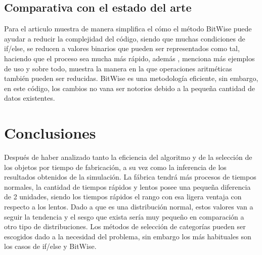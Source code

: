 \documentclass{article}
\begin{document}
\subsection{Comparativa con el estado del arte}
Para el articulo \citep{article}muestra de manera simplifica el cómo el método BitWise puede ayudar a reducir la complejidad del código, siendo que muchas condiciones de if/else, se reducen a valores binarios que pueden ser representados como tal, haciendo que el proceso sea mucha más rápido, además \citep{chandra2013application}, menciona más ejemplos de uso y sobre todo, muestra la manera en la que operaciones aritméticas también pueden ser reducidas.
BitWise es una metodología eficiente, sin embargo, en este código, los cambios no vana ser notorios debido a la pequeña cantidad de datos existentes.
\section{Conclusiones}
Después de haber analizado tanto la eficiencia del algoritmo y de la selección de los objetos por tiempo de fabricación, a su vez como la inferencia de los resultados obtenidos de la simulación. La fábrica tendrá más procesos de tiempos normales, la cantidad de tiempos rápidos y lentos posee una pequeña diferencia de 2 unidades, siendo los tiempos rápidos el rango con esa ligera ventaja con respecto a los lentos. Dado a que es una distribución normal, estos valores van a seguir la tendencia y el sesgo que exista sería muy pequeño en comparación a otro tipo de distribuciones. 
Los métodos de selección de categorías pueden ser escogidos dado a la necesidad del problema, sin embargo los más habituales son los casos de if/else y BitWise. 


%
\end{document}
